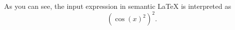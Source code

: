 As you can see, the input expression in semantic \LaTeX{} is interpreted as
\begin{equation}\label{eq:multi-expo}
\left( \cos(x)^2 \right)^2.
\end{equation}




